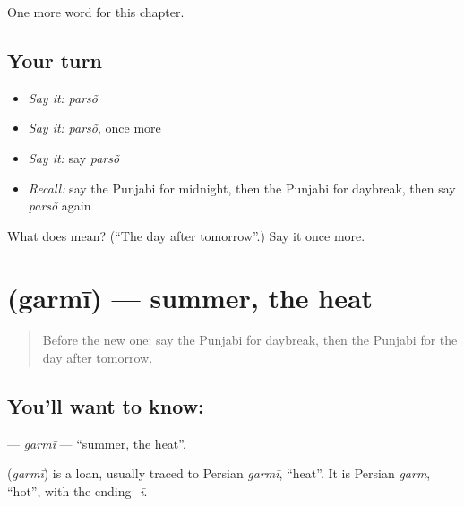 \begin{grammarlens}[title={What you've built}]
One more word for this chapter.
\end{grammarlens}

\subsection*{Your turn}
\begin{itemize}
\raggedright
  \item \emph{Say it:} \emph{parsõ}
  \item \emph{Say it:} \emph{parsõ}, once more
  \item \emph{Say it:} say \emph{parsõ}
  \item \emph{Recall:} say the Punjabi for midnight, then the Punjabi for daybreak, then say \emph{parsõ} again
\end{itemize}

\begin{tcolorbox}[breakable,colback=teal!4,colframe=teal!35!black,title={Before you move on}]
What does  mean? (\textquotedblleft{}The day after tomorrow\textquotedblright{}.) Say it once more.
\end{tcolorbox}
\section[\texorpdfstring{\pa{ਗਰਮੀ} (garmī)}{ਗਰਮੀ (garmī)}]{ (garmī) — summer, the heat}

\label{lesson:PA-C99-garmi}



\begin{quote}
Before the new one: say the Punjabi for daybreak, then the Punjabi for the day after tomorrow.
\end{quote}

\subsection*{You'll want to know: }
\textbf{} — \emph{garmī} — \textquotedblleft{}summer, the heat\textquotedblright{}.

\begin{cousinweb}
\textbf{} (\emph{garmī}) is a loan, usually traced to Persian \emph{garmī}, \textquotedblleft{}heat\textquotedblright{}. It is Persian \emph{garm}, \textquotedblleft{}hot\textquotedblright{}, with the ending \emph{-ī}.
\end{cousinweb}

